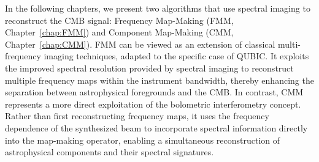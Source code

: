 \documentclass[../../thesis.tex]{subfiles}
\begin{document}
In the following chapters, we present two algorithms that use spectral imaging to reconstruct the CMB signal: Frequency Map-Making (FMM, Chapter~\ref{chap:FMM}) and Component Map-Making (CMM, Chapter~\ref{chap:CMM}). 
FMM can be viewed as an extension of classical multi-frequency imaging techniques, adapted to the specific case of QUBIC. It exploits the improved spectral resolution provided by spectral imaging to reconstruct multiple frequency maps within the instrument bandwidth, thereby enhancing the separation between astrophysical foregrounds and the CMB.
In contrast, CMM represents a more direct exploitation of the bolometric interferometry concept. Rather than first reconstructing frequency maps, it uses the frequency dependence of the synthesized beam to incorporate spectral information directly into the map-making operator, enabling a simultaneous reconstruction of astrophysical components and their spectral signatures.
\end{document}
